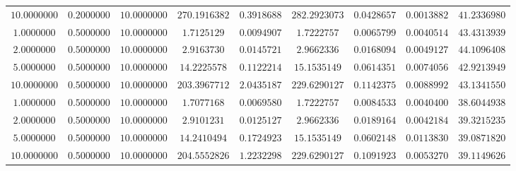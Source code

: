 \begin{tabular}{ccccccccc}
$10.0000000$ & $0.2000000$ & $10.0000000$ & $270.1916382$ & $0.3918688$ & $282.2923073$ & $0.0428657$ & $0.0013882$ & $41.2336980$\\
$1.0000000$ & $0.5000000$ & $10.0000000$ & $1.7125129$ & $0.0094907$ & $1.7222757$ & $0.0065799$ & $0.0040514$ & $43.4313939$\\
$2.0000000$ & $0.5000000$ & $10.0000000$ & $2.9163730$ & $0.0145721$ & $2.9662336$ & $0.0168094$ & $0.0049127$ & $44.1096408$\\
$5.0000000$ & $0.5000000$ & $10.0000000$ & $14.2225578$ & $0.1122214$ & $15.1535149$ & $0.0614351$ & $0.0074056$ & $42.9213949$\\
$10.0000000$ & $0.5000000$ & $10.0000000$ & $203.3967712$ & $2.0435187$ & $229.6290127$ & $0.1142375$ & $0.0088992$ & $43.1341550$\\
$1.0000000$ & $0.5000000$ & $10.0000000$ & $1.7077168$ & $0.0069580$ & $1.7222757$ & $0.0084533$ & $0.0040400$ & $38.6044938$\\
$2.0000000$ & $0.5000000$ & $10.0000000$ & $2.9101231$ & $0.0125127$ & $2.9662336$ & $0.0189164$ & $0.0042184$ & $39.3215235$\\
$5.0000000$ & $0.5000000$ & $10.0000000$ & $14.2410494$ & $0.1724923$ & $15.1535149$ & $0.0602148$ & $0.0113830$ & $39.0871820$\\
$10.0000000$ & $0.5000000$ & $10.0000000$ & $204.5552826$ & $1.2232298$ & $229.6290127$ & $0.1091923$ & $0.0053270$ & $39.1149626$\\
\end{tabular}

